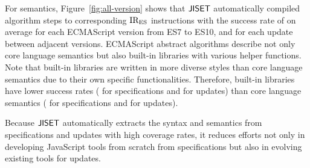 For semantics, Figure~\ref{fig:all-version} shows that \( \text{\sf JISET} \) automatically
compiled algorithm steps to corresponding \( \text{IR}_\text{ES} \) instructions with
the success rate of  on average for each ECMAScript version
from ES7 to ES10, and  for each update between adjacent
versions.  ECMAScript abstract algorithms describe not only
core language semantics but also built-in libraries with various helper functions.
Note that built-in libraries are written in more diverse styles than
core language semantics due to their own specific functionalities.
Therefore, built-in libraries have lower success rates
( for specifications and  for updates) than core
language semantics ( for specifications and  for
updates).

Because \( \text{\sf JISET} \) automatically extracts the syntax
and semantics from specifications and updates with high coverage rates,
it reduces efforts not only in developing JavaScript tools from scratch
from specifications but also in evolving existing tools for updates.


